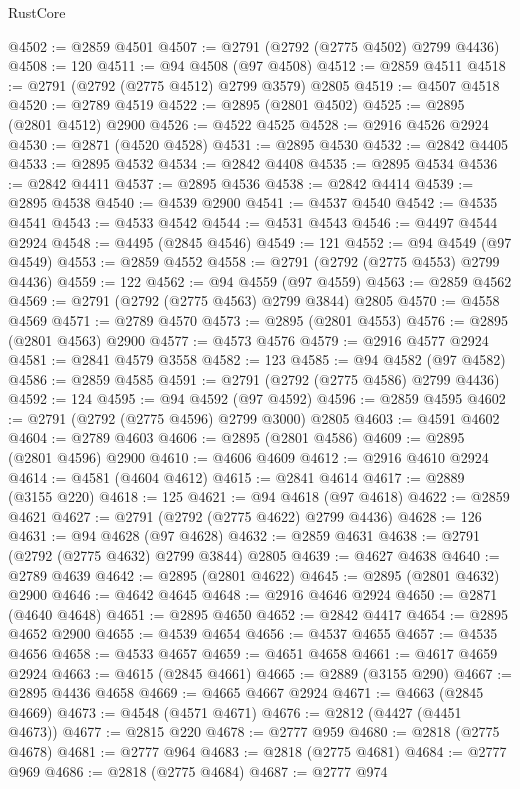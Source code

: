 \begin{lexlean}{RustCore}
\begin{coremodule}
@4502 := @2859 @4501
@4507 := @2791 (@2792 (@2775 @4502) @2799 @4436)
@4508 := 120
@4511 := @94 @4508 (@97 @4508)
@4512 := @2859 @4511
@4518 := @2791 (@2792 (@2775 @4512) @2799 @3579) @2805
@4519 := @4507 @4518
@4520 := @2789 @4519
@4522 := @2895 (@2801 @4502)
@4525 := @2895 (@2801 @4512) @2900
@4526 := @4522 @4525
@4528 := @2916 @4526 @2924
@4530 := @2871 (@4520 @4528)
@4531 := @2895 @4530
@4532 := @2842 @4405
@4533 := @2895 @4532
@4534 := @2842 @4408
@4535 := @2895 @4534
@4536 := @2842 @4411
@4537 := @2895 @4536
@4538 := @2842 @4414
@4539 := @2895 @4538
@4540 := @4539 @2900
@4541 := @4537 @4540
@4542 := @4535 @4541
@4543 := @4533 @4542
@4544 := @4531 @4543
@4546 := @4497 @4544 @2924
@4548 := @4495 (@2845 @4546)
@4549 := 121
@4552 := @94 @4549 (@97 @4549)
@4553 := @2859 @4552
@4558 := @2791 (@2792 (@2775 @4553) @2799 @4436)
@4559 := 122
@4562 := @94 @4559 (@97 @4559)
@4563 := @2859 @4562
@4569 := @2791 (@2792 (@2775 @4563) @2799 @3844) @2805
@4570 := @4558 @4569
@4571 := @2789 @4570
@4573 := @2895 (@2801 @4553)
@4576 := @2895 (@2801 @4563) @2900
@4577 := @4573 @4576
@4579 := @2916 @4577 @2924
@4581 := @2841 @4579 @3558
@4582 := 123
@4585 := @94 @4582 (@97 @4582)
@4586 := @2859 @4585
@4591 := @2791 (@2792 (@2775 @4586) @2799 @4436)
@4592 := 124
@4595 := @94 @4592 (@97 @4592)
@4596 := @2859 @4595
@4602 := @2791 (@2792 (@2775 @4596) @2799 @3000) @2805
@4603 := @4591 @4602
@4604 := @2789 @4603
@4606 := @2895 (@2801 @4586)
@4609 := @2895 (@2801 @4596) @2900
@4610 := @4606 @4609
@4612 := @2916 @4610 @2924
@4614 := @4581 (@4604 @4612)
@4615 := @2841 @4614
@4617 := @2889 (@3155 @220)
@4618 := 125
@4621 := @94 @4618 (@97 @4618)
@4622 := @2859 @4621
@4627 := @2791 (@2792 (@2775 @4622) @2799 @4436)
@4628 := 126
@4631 := @94 @4628 (@97 @4628)
@4632 := @2859 @4631
@4638 := @2791 (@2792 (@2775 @4632) @2799 @3844) @2805
@4639 := @4627 @4638
@4640 := @2789 @4639
@4642 := @2895 (@2801 @4622)
@4645 := @2895 (@2801 @4632) @2900
@4646 := @4642 @4645
@4648 := @2916 @4646 @2924
@4650 := @2871 (@4640 @4648)
@4651 := @2895 @4650
@4652 := @2842 @4417
@4654 := @2895 @4652 @2900
@4655 := @4539 @4654
@4656 := @4537 @4655
@4657 := @4535 @4656
@4658 := @4533 @4657
@4659 := @4651 @4658
@4661 := @4617 @4659 @2924
@4663 := @4615 (@2845 @4661)
@4665 := @2889 (@3155 @290)
@4667 := @2895 @4436 @4658
@4669 := @4665 @4667 @2924
@4671 := @4663 (@2845 @4669)
@4673 := @4548 (@4571 @4671)
@4676 := @2812 (@4427 (@4451 @4673))
@4677 := @2815 @220
@4678 := @2777 @959
@4680 := @2818 (@2775 @4678)
@4681 := @2777 @964
@4683 := @2818 (@2775 @4681)
@4684 := @2777 @969
@4686 := @2818 (@2775 @4684)
@4687 := @2777 @974

\end{coremodule}
\end{lexlean}
